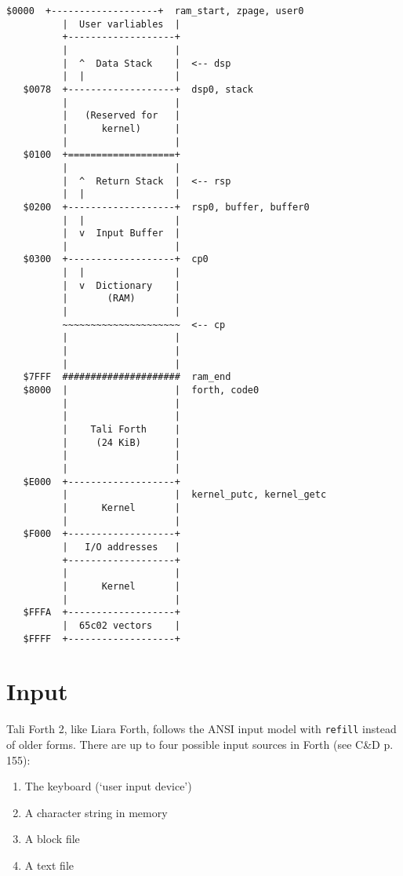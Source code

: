 \begin{lstlisting}[frame=single]
   $0000  +-------------------+  ram_start, zpage, user0
          |  User varliables  |
          +-------------------+  
          |                   |
          |  ^  Data Stack    |  <-- dsp
          |  |                |
   $0078  +-------------------+  dsp0, stack
          |                   |
          |   (Reserved for   |
          |      kernel)      |
          |                   |
   $0100  +===================+  
          |                   |
          |  ^  Return Stack  |  <-- rsp 
          |  |                |
   $0200  +-------------------+  rsp0, buffer, buffer0
          |  |                |
          |  v  Input Buffer  |
          |                   |
   $0300  +-------------------+  cp0
          |  |                |
          |  v  Dictionary    |
          |       (RAM)       |
          |                   |
          ~~~~~~~~~~~~~~~~~~~~~  <-- cp
          |                   |
          |                   |
          |                   |
   $7FFF  #####################  ram_end
   $8000  |                   |  forth, code0
          |                   |
          |                   |
          |    Tali Forth     |
          |     (24 KiB)      |
          |                   |
          |                   |
   $E000  +-------------------+
          |                   |  kernel_putc, kernel_getc   
          |      Kernel       |
          |                   |
   $F000  +-------------------+  
          |   I/O addresses   |
          +-------------------+     
          |                   |
          |      Kernel       |
          |                   |
   $FFFA  +-------------------+     
          |  65c02 vectors    |
   $FFFF  +-------------------+     
\end{lstlisting}

\pagebreak

\section{Input}

Tali Forth 2, like Liara Forth, follows the ANSI input model
with \texttt{refill} instead of older forms. There are up to four possible input
sources in Forth (see C\&D p. 155):

\begin{enumerate}
        \item The keyboard (`user input device')
        \item A character string in memory
        \item A block file
        \item A text file
\end{enumerate}

